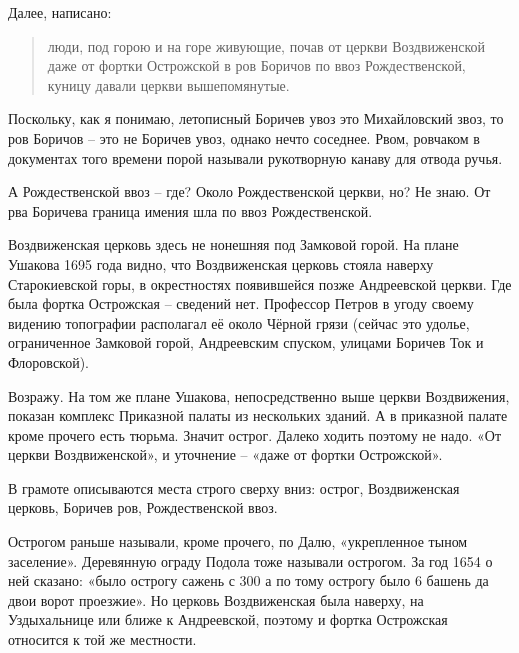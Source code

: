 Далее, написано: 

\begin{quotation}
люди, под горою и на горе живующие, почав от церкви Воздвиженской даже от фортки Острожской в ров Боричов по ввоз Рождественской, куницу давали церкви вышепомянутые.
\end{quotation}

Поскольку, как я понимаю, летописный Боричев увоз это Михайловский звоз, то ров Боричов – это не Боричев увоз, однако нечто соседнее. Рвом, ровчаком в документах того времени порой называли рукотворную канаву для отвода ручья. 

А Рождественской ввоз – где? Около Рождественской церкви, но? Не знаю. От рва Боричева граница имения шла по ввоз Рождественской.

Воздвиженская церковь здесь не нонешняя под Замковой горой. На плане Ушакова 1695 года видно, что Воздвиженская церковь стояла наверху Старокиевской горы, в окрестностях появившейся позже Андреевской церкви. Где была фортка Острожская – сведений нет. Профессор Петров в угоду своему видению топографии располагал её около Чёрной грязи (сейчас это удолье, ограниченное Замковой горой, Андреевским спуском, улицами Боричев Ток и Флоровской).

Возражу. На том же плане Ушакова, непосредственно выше церкви Воздвижения, показан комплекс Приказной палаты из нескольких зданий. А в приказной палате кроме прочего есть тюрьма. Значит острог. Далеко ходить поэтому не надо. «От церкви Воздвиженской», и уточнение – «даже от фортки Острожской».

В грамоте описываются места строго сверху вниз: острог, Воздвиженская церковь, Боричев ров, Рождественской ввоз.

Острогом раньше называли, кроме прочего, по Далю, «укрепленное тыном заселение». Деревянную ограду Подола тоже называли острогом. За год 1654 о ней сказано: «было острогу сажень с 300 а по тому острогу было 6 башень да двои ворот проезжие»\cite[том X, стр. 387]{akty}. Но церковь Воздвиженская была наверху, на Уздыхальнице или ближе к Андреевской, поэтому и фортка Острожская относится к той же местности.



